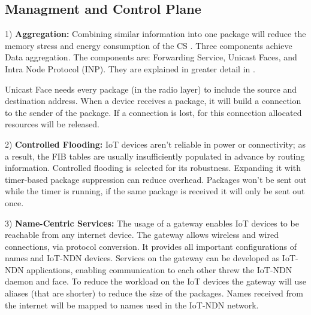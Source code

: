 \documentclass[conference]{IEEEtran}
\begin{document}
\subsection{Managment and Control Plane}
1) \textbf{Aggregation:} Combining similar information into one package will reduce the memory stress and energy consumption of the CS \cite{b5}.
Three components achieve Data aggregation. The components are: Forwarding Service, Unicast Faces, and Intra Node Protocol (INP). They are explained in greater detail in \cite{b5}.

Unicast Face needs every package (in the radio layer) to include the source and destination address. 
When a device receives a package, it will build a connection to the sender of the package. 
If a connection is lost, for this connection allocated resources will be released. 

2) \textbf{Controlled Flooding:}
IoT devices aren't reliable in power or connectivity; as a result, the FIB tables are usually insufficiently populated in advance by routing information. 
Controlled flooding is selected for its robustness. Expanding it with timer-based package suppression can reduce overhead. 
Packages won't be sent out while the timer is running, 
if the same package is received it will only be sent out once.


3) \textbf{Name-Centric Services:}
The usage of a gateway enables IoT devices to be reachable from any internet device. 
The gateway allows wireless and wired connections, via protocol conversion. 
It provides all important configurations of names and  IoT-NDN devices. Services on the gateway can be developed as IoT-NDN applications, enabling communication to each other threw the IoT-NDN daemon and face. 
To reduce the workload on the IoT devices the gateway will use aliases (that are shorter) to reduce the size of the packages.
Names received from the internet will be mapped to names used in the IoT-NDN network.
\end{document}
